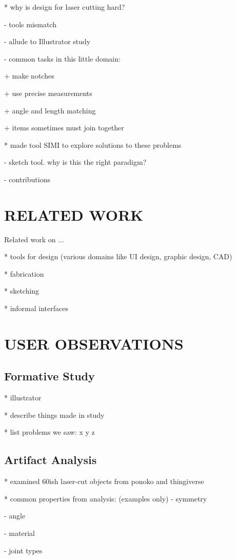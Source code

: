 \documentclass{article}
\begin{document}
* why is design for laser cutting hard?

  - tools mismatch

  - allude to Illustrator study

  - common tasks in this little domain:

    + make notches

    + use precise measurements

    + angle and length matching

    + items sometimes must join together

* made tool SIMI to explore solutions to these problems

  - sketch tool. why is this the right paradigm?

  - contributions

\section{RELATED WORK}
Related work on ...

* tools for design (various domains like UI design, graphic design, CAD)

* fabrication

* sketching

* informal interfaces 

\section{USER OBSERVATIONS}

\subsection{Formative Study}

* illustrator

* describe things made in study

* list problems we saw: x y z

\subsection{Artifact Analysis}

* examined 60ish laser-cut objects from ponoko and thingiverse

* common properties from analysis: (examples only)
  - symmetry

  - angle

  - material

  - joint types
\end{document}
